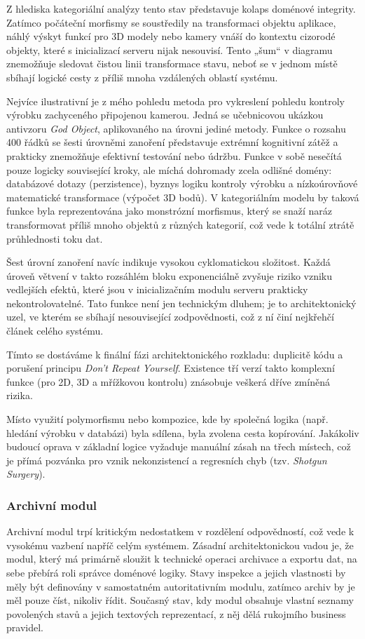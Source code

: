 \documentclass[FM,DP,fonts]{tulthesis}
\begin{document}
Z hlediska kategoriální analýzy tento stav představuje kolaps doménové integrity. Zatímco počáteční morfismy se soustředily na transformaci objektu aplikace, náhlý výskyt funkcí pro 3D modely nebo kamery vnáší do kontextu cizorodé objekty, které s inicializací serveru nijak nesouvisí. Tento „šum“ v diagramu znemožňuje sledovat čistou linii transformace stavu, neboť se v jednom místě sbíhají logické cesty z příliš mnoha vzdálených oblastí systému.

Nejvíce ilustrativní je z mého pohledu metoda pro vykreslení pohledu kontroly výrobku zachyceného připojenou kamerou. Jedná se učebnicovou ukázkou antivzoru \textit{God Object}, aplikovaného na úrovni jediné metody. Funkce o rozsahu 400 řádků se šesti úrovněmi zanoření představuje extrémní kognitivní zátěž a prakticky znemožňuje efektivní testování nebo údržbu. Funkce v sobě nesečítá pouze logicky související kroky, ale míchá dohromady zcela odlišné domény: databázové dotazy (perzistence), byznys logiku kontroly výrobku a nízkoúrovňové matematické transformace (výpočet 3D bodů). V kategoriálním modelu by taková funkce byla reprezentována jako monstrózní morfismus, který se snaží naráz transformovat příliš mnoho objektů z různých kategorií, což vede k totální ztrátě průhlednosti toku dat.

Šest úrovní zanoření navíc indikuje vysokou cyklomatickou složitost. Každá úroveň větvení v takto rozsáhlém bloku exponenciálně zvyšuje riziko vzniku vedlejších efektů, které jsou v inicializačním modulu serveru prakticky nekontrolovatelné. Tato funkce není jen technickým dluhem; je to architektonický uzel, ve kterém se sbíhají nesouvisející zodpovědnosti, což z ní činí nejkřehčí článek celého systému.

Tímto se dostáváme k finální fázi architektonického rozkladu: duplicitě kódu a porušení principu \textit{Don't Repeat Yourself}. Existence tří verzí takto komplexní funkce (pro 2D, 3D a mřížkovou kontrolu) znásobuje veškerá dříve zmíněná rizika.

Místo využití polymorfismu nebo kompozice, kde by společná logika (např. hledání výrobku v databázi) byla sdílena, byla zvolena cesta kopírování. Jakákoliv budoucí oprava v základní logice vyžaduje manuální zásah na třech místech, což je přímá pozvánka pro vznik nekonzistencí a regresních chyb (tzv. \textit{Shotgun Surgery}).

\subsubsection{Archivní modul}
Archivní modul trpí kritickým nedostatkem v rozdělení odpovědností, což vede k vysokému vazbení napříč celým systémem. Zásadní architektonickou vadou je, že modul, který má primárně sloužit k technické operaci archivace a exportu dat, na sebe přebírá roli správce doménové logiky. Stavy inspekce a jejich vlastnosti by měly být definovány v samostatném autoritativním modulu, zatímco archiv by je měl pouze číst, nikoliv řídit. Současný stav, kdy modul obsahuje vlastní seznamy povolených stavů a jejich textových reprezentací, z něj dělá rukojmího business pravidel.
\end{document}
